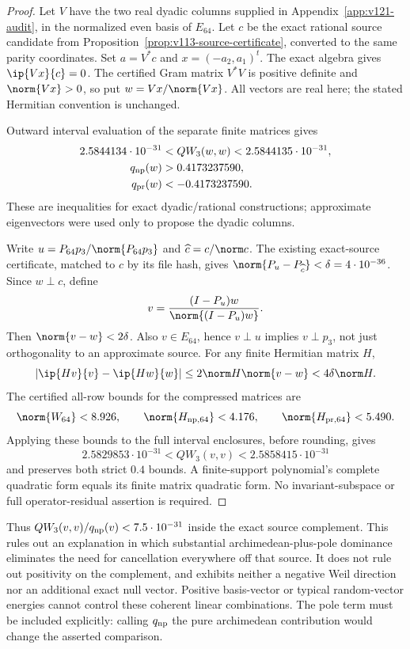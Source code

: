 \begin{proof}
Let $V$ have the two real dyadic columns supplied in
Appendix~\ref{app:v121-audit}, in the normalized even basis of $E_{64}$.
Let $c$ be the exact rational source candidate from
Proposition~\ref{prop:v113-source-certificate}, converted to the same
parity coordinates. Set $a=V^*c$ and $x=(-a_2,a_1)^t$. The exact
algebra gives $\ip{Vx}{c}=0$. The certified Gram matrix $V^*V$ is
positive definite and $\norm{Vx}>0$, so put $w=Vx/\norm{Vx}$.
All vectors are real here; the stated Hermitian convention is unchanged.

Outward interval evaluation of the separate finite matrices gives
\[
 \begin{aligned}
 2.5844134\cdot10^{-31}&<QW_3(w,w)<2.5844135\cdot10^{-31},\\
 q_{\rm np}(w)&>0.4173237590,\\
 q_{\rm pr}(w)&<-0.4173237590.
 \end{aligned}
\]
These are inequalities for exact dyadic/rational constructions;
approximate eigenvectors were used only to propose the dyadic columns.

Write $u=P_{64}p_3/\norm{P_{64}p_3}$ and $\widehat c=c/\norm c$.
The existing exact-source certificate, matched to $c$ by its file hash,
gives $\norm{P_u-P_{\widehat c}}<\delta=4\cdot10^{-36}$.
Since $w\perp c$, define
\[
 v=\frac{(I-P_u)w}{\norm{(I-P_u)w}}.
\]
Then $\norm{v-w}<2\delta$. Also $v\in E_{64}$, hence $v\perp u$
implies $v\perp p_3$, not just orthogonality to an approximate source.
For any finite Hermitian matrix $H$,
\[
 |\ip{Hv}{v}-\ip{Hw}{w}|
 \le2\norm H\norm{v-w}<4\delta\norm H.
\]
The certified all-row bounds for the compressed matrices are
\[
 \norm{W_{64}}<8.926,\qquad
 \norm{H_{\rm np,64}}<4.176,\qquad
 \norm{H_{\rm pr,64}}<5.490.
\]
Applying these bounds to the full interval enclosures, before rounding,
gives
\[
 2.5829853\cdot10^{-31}<QW_3(v,v)<2.5858415\cdot10^{-31}
\]
and preserves both strict $0.4$ bounds. A finite-support polynomial's
complete quadratic form equals its finite matrix quadratic form.
No invariant-subspace or full operator-residual assertion is required.
\end{proof}

Thus $QW_3(v,v)/q_{\rm np}(v)<7.5\cdot10^{-31}$ inside the exact
source complement. This rules out an explanation in which substantial
archimedean-plus-pole dominance eliminates the need for cancellation
everywhere off that source. It does not rule out positivity on the
complement, and exhibits neither a negative Weil direction nor an
additional exact null vector. Positive basis-vector or typical
random-vector energies cannot control these coherent linear combinations.
The pole term must be included explicitly: calling $q_{\rm np}$ the
pure archimedean contribution would change the asserted comparison.

